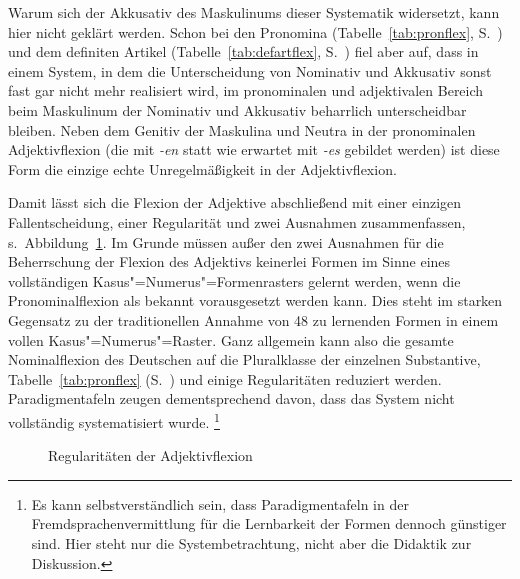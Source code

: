 Warum sich der Akkusativ des Maskulinums dieser Systematik widersetzt, kann hier nicht geklärt werden.
Schon bei den Pronomina (Tabelle~\ref{tab:pronflex}, S.~\pageref{tab:pronflex}) und dem definiten Artikel (Tabelle~\ref{tab:defartflex}, S.~\pageref{tab:defartflex}) fiel aber auf, dass in einem System, in dem die Unterscheidung von Nominativ und Akkusativ sonst fast gar nicht mehr realisiert wird, im pronominalen und adjektivalen Bereich beim Maskulinum der Nominativ und Akkusativ beharrlich unterscheidbar bleiben.
Neben dem Genitiv der Maskulina und Neutra in der pronominalen Adjektivflexion (die mit \textit{-en} statt wie erwartet mit \textit{-es} gebildet werden) ist diese Form die einzige echte Unregelmäßigkeit in der Adjektivflexion.

Damit lässt sich die Flexion der Adjektive abschließend mit einer einzigen Fallentscheidung, einer Regularität und zwei Ausnahmen zusammenfassen, s.\ Abbildung~\ref{fig:adjregeln}.
Im Grunde müssen außer den zwei Ausnahmen für die Beherrschung der Flexion des Adjektivs keinerlei Formen im Sinne eines vollständigen Kasus"=Numerus"=Formenrasters gelernt werden, wenn die Pronominalflexion als bekannt vorausgesetzt werden kann.
Dies steht im starken Gegensatz zu der traditionellen Annahme von 48 zu lernenden Formen in einem vollen Kasus"=Numerus"=Raster.
Ganz allgemein kann also die gesamte Nominalflexion des Deutschen auf die Pluralklasse der einzelnen Substantive, Tabelle~\ref{tab:pronflex} (S.~\pageref{tab:pronflex}) und einige Regularitäten reduziert werden.
Paradigmentafeln zeugen dementsprechend davon, dass das System nicht vollständig systematisiert wurde.%
\footnote{Es kann selbstverständlich sein, dass Paradigmentafeln \zB in der Fremdsprachenvermittlung für die Lernbarkeit der Formen dennoch günstiger sind.
Hier steht nur die Systembetrachtung, nicht aber die Didaktik zur Diskussion.}

\begin{figure}[!htbp]
  \caption{Regularitäten der Adjektivflexion}
  \label{fig:adjregeln}
\end{figure}

